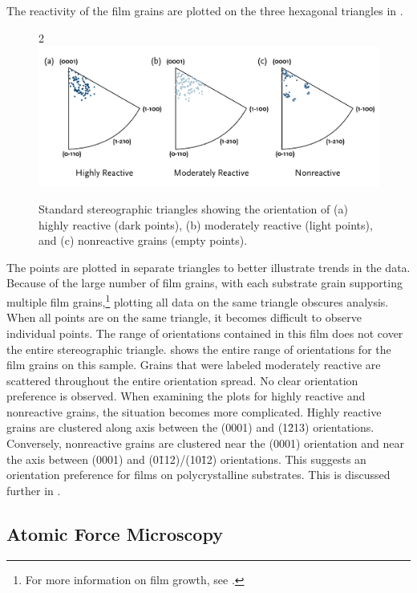 The reactivity of the film grains are plotted on the three hexagonal triangles in
. 
\begin{figure}2
	\includegraphics[width=\textwidth]{filmplots.pdf}
		\caption[Orientation of film grains]{%
			Standard stereographic triangles showing the orientation
			of (a) highly reactive (dark points), (b) moderately reactive
			(light points), and (c) nonreactive grains (empty points).}
	\label{fig:filmplots}

\end{figure}
The points are plotted in separate triangles to better illustrate trends in the data.
Because of the large number of film grains, with each substrate grain supporting multiple
film grains,\footnote{For more information on film growth, see
.} plotting all data on the same triangle obscures
analysis. When all points are on the same triangle, it becomes difficult to observe
individual points. The range of orientations contained in this film does not cover the
entire stereographic triangle.  shows the entire range of
orientations for the film grains on this sample. Grains that were labeled moderately
reactive are scattered throughout the entire orientation spread. No clear orientation
preference is observed. When examining the plots for highly reactive and nonreactive
grains, the situation becomes more complicated. Highly reactive grains are clustered along
axis between the (0001) and (1\={2}13) orientations. Conversely, nonreactive grains are
clustered near the (0001) orientation and near the axis between (0001) and
(0\={1}12)/(10\={1}2) orientations. This suggests an orientation preference for
 films on polycrystalline  substrates. This is discussed further in
.


\subsection{Atomic Force Microscopy}
\label{subsec:poly.reac.afm}


